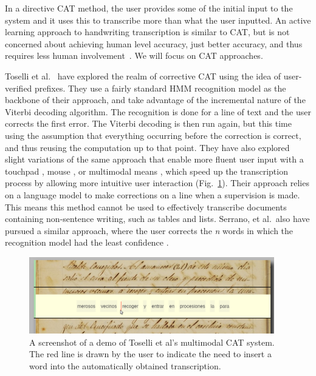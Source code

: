 \documentclass[ms,electronic,twosidetoc,letterpaper,chaptercenter,parttop,lol,lof,lot]{byumsphd}
\begin{document}
In a directive CAT method, the user provides some of the initial input to the system and it uses this to transcribe more than what the user inputted.
An active learning approach to handwriting transcription is similar to CAT, but is not concerned about achieving human level accuracy, just better accuracy, and thus requires less human involvement~\cite{Serrano2010}. 
We will focus on CAT approaches.

Toselli et al.~\cite{Toselli2007} have explored the realm of corrective CAT using the idea of user-verified prefixes. They use a fairly standard HMM recognition model as the backbone of their approach, and take advantage of the incremental nature of the Viterbi decoding algorithm. The recognition is done for a line of text and the user corrects the first error. The Viterbi decoding is then run again, but this time using the assumption that everything occurring before the correction is correct, and thus reusing the computation up to that point. They have also explored slight variations of the same approach that enable more fluent user input with a touchpad \cite{Toselli2008}, mouse \cite{Toselli2009}, or multimodal means \cite{Toselli2010}, which speed up the transcription process by allowing more intuitive user interaction (Fig.~\ref{fig:Toselli_multimodalCAT}). Their approach relies on a language model to make corrections on a line when a supervision is made. This means this method cannot be used to effectively transcribe documents containing non-sentence writing, such as tables and lists. Serrano, et al.~also have pursued a similar approach, where the user corrects the \textit{n} words in which the recognition model had the least confidence \cite{Serrano2014}.

\begin{figure}
    \centering
    \includegraphics[width=0.95\textwidth]{Toselli_multimodalCAT}
    \caption{A screenshot of a demo of Toselli et al's multimodal CAT system. The red line is drawn by the user to indicate the need to insert a word into the automatically obtained transcription.}
    \label{fig:Toselli_multimodalCAT}
\end{figure}
\end{document}
